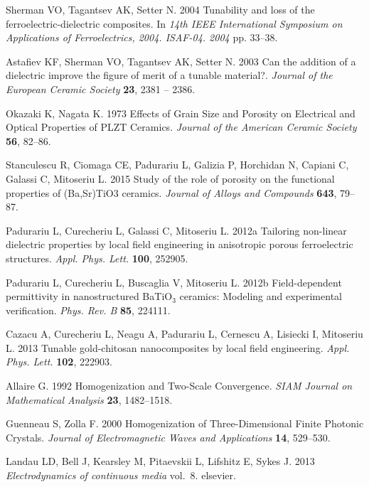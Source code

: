 \documentclass[%
 aip,
 amsmath,amssymb,
 reprint,%
]{revtex4-1}
\begin{document}
\begin{thebibliography}{99}
Sherman VO, Tagantsev AK, Setter N. 2004  Tunability and loss of the
  ferroelectric-dielectric composites. In {\em 14th {IEEE} {International}
  {Symposium} on {Applications} of {Ferroelectrics}, 2004. {ISAF}-04. 2004} pp.
  33--38.

Astafiev KF, Sherman VO, Tagantsev AK, Setter N. 2003  Can the addition of a
  dielectric improve the figure of merit of a tunable material?. {\em Journal
  of the European Ceramic Society} \textbf{23}, 2381 -- 2386.

Okazaki K, Nagata K. 1973  Effects of {Grain} {Size} and {Porosity} on
  {Electrical} and {Optical} {Properties} of {PLZT} {Ceramics}. {\em Journal of
  the American Ceramic Society} \textbf{56}, 82--86.

Stanculescu R, Ciomaga CE, Padurariu L, Galizia P, Horchidan N, Capiani C,
  Galassi C, Mitoseriu L. 2015  Study of the role of porosity on the functional
  properties of ({Ba},{Sr}){TiO}3 ceramics. {\em Journal of Alloys and
  Compounds} \textbf{643}, 79--87.

Padurariu L, Curecheriu L, Galassi C, Mitoseriu L. 2012a  Tailoring non-linear
  dielectric properties by local field engineering in anisotropic porous
  ferroelectric structures. {\em Appl. Phys. Lett.} \textbf{100}, 252905.

Padurariu L, Curecheriu L, Buscaglia V, Mitoseriu L. 2012b  Field-dependent
  permittivity in nanostructured {BaTiO}$_3$ ceramics: {Modeling} and
  experimental verification. {\em Phys. Rev. B} \textbf{85}, 224111.

Cazacu A, Curecheriu L, Neagu A, Padurariu L, Cernescu A, Lisiecki I, Mitoseriu
  L. 2013  Tunable gold-chitosan nanocomposites by local field engineering.
  {\em Appl. Phys. Lett.} \textbf{102}, 222903.

Allaire G. 1992  Homogenization and {Two}-{Scale} {Convergence}. {\em SIAM
  Journal on Mathematical Analysis} \textbf{23}, 1482--1518.

Guenneau S, Zolla F. 2000  Homogenization of {Three}-{Dimensional} {Finite}
  {Photonic} {Crystals}. {\em Journal of Electromagnetic Waves and
  Applications} \textbf{14}, 529--530.

Landau LD, Bell J, Kearsley M, Pitaevskii L, Lifshitz E, Sykes J. 2013 {\em
  Electrodynamics of continuous media} vol.~8.
elsevier.


\end{thebibliography}
\end{document}
